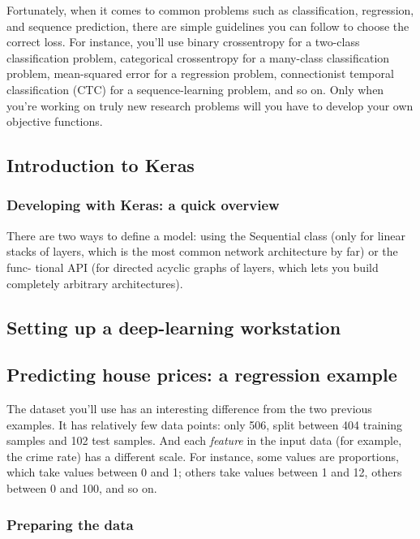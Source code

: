 \documentclass{article}
\numberwithin{equation}{section} %
\begin{document}
Fortunately, when it comes to common problems such as classification, regression,
and sequence prediction, there are simple guidelines you can follow to choose the
correct loss. For instance, you’ll use binary crossentropy for a two-class classification problem, categorical crossentropy for a many-class classification problem, mean-squared error for a regression problem, connectionist temporal classification (CTC) for a sequence-learning problem, and so on. Only when you’re working on truly new research problems will you have to develop your own objective functions. \\

\subsection{Introduction to Keras}

\subsubsection{Developing with Keras: a quick overview}

There are two ways to define a model: using the Sequential class (only for linear
stacks of layers, which is the most common network architecture by far) or the func-
tional API (for directed acyclic graphs of layers, which lets you build completely arbitrary architectures).


\subsection{Setting up a deep-learning workstation}




\subsection{Predicting house prices: a regression example}

The dataset you’ll use has an interesting difference from the two previous examples. It has relatively few data points: only 506, split between 404 training samples and 102 test samples. And each \textit{feature} in the input data (for example, the crime rate) has a different scale. For instance, some values are proportions, which take values between 0 and 1; others take values between 1 and 12, others between 0 and 100, and so on.

\subsubsection{Preparing the data}
\end{document}
